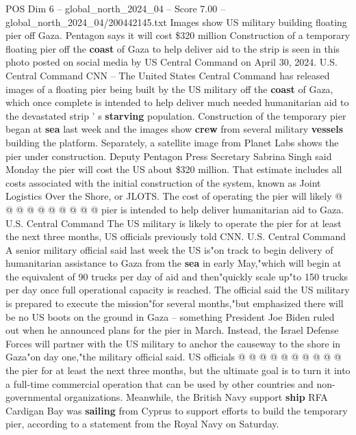 \begin{textsample}{POS Dim 6 – global\_north\_2024\_04 – Score 7.00 – global\_north\_2024\_04/200442145.txt}  \label{ex:f6_pos_119}
Images show US military building floating pier off Gaza.
Pentagon says it will cost \$320 million Construction of a temporary floating pier off the \textbf{coast} of Gaza to help deliver aid to the strip is seen in this photo posted on social media by US Central Command on April 30, 2024.
U.S.
Central Command CNN -- The United States Central Command has released images of a floating pier being built by the US military off the \textbf{coast} of Gaza, which once complete is intended to help deliver much needed humanitarian aid to the devastated strip ' s \textbf{starving} population.
Construction of the temporary pier began at \textbf{sea} last week and the images show \textbf{crew} from several military \textbf{vessels} building the platform.
Separately, a satellite image from Planet Labs shows the pier under construction.
Deputy Pentagon Press Secretary Sabrina Singh said Monday the pier will cost the US about \$320 million.
That estimate includes all costs associated with the initial construction of the system, known as Joint Logistics Over the Shore, or JLOTS.
The cost of operating the pier will likely @ @ @ @ @ @ @ @ @ @ pier is intended to help deliver humanitarian aid to Gaza.
U.S.
Central Command The US military is likely to operate the pier for at least the next three months, US officials previously told CNN.
U.S.
Central Command A senior military official said last week the US is"on track to begin delivery of humanitarian assistance to Gaza from the \textbf{sea} in early May,"which will begin at the equivalent of 90 trucks per day of aid and then"quickly scale up"to 150 trucks per day once full operational capacity is reached.
The official said the US military is prepared to execute the mission"for several months,"but emphasized there will be no US boots on the ground in Gaza -- something President Joe Biden ruled out when he announced plans for the pier in March.
Instead, the Israel Defense Forces will partner with the US military to anchor the causeway to the shore in Gaza"on day one,"the military official said.
US officials @ @ @ @ @ @ @ @ @ @ the pier for at least the next three months, but the ultimate goal is to turn it into a full-time commercial operation that can be used by other countries and non-governmental organizations.
Meanwhile, the British Navy support \textbf{ship} RFA Cardigan Bay was \textbf{sailing} from Cyprus to support efforts to build the temporary pier, according to a statement from the Royal Navy on Saturday.

\end{textsample}
